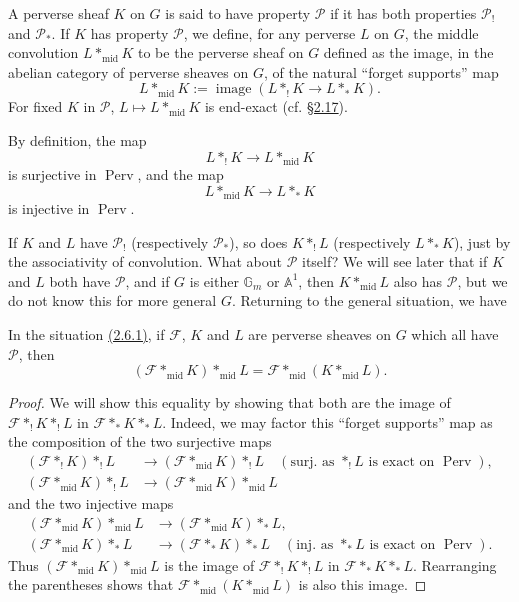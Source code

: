 A perverse sheaf \(K\) on \(G\) is said to have property \(\mathcal{P}\) if it
has both properties \(\mathcal{P}_!\) and \(\mathcal{P}_*\). If \(K\) has
property \(\mathcal{P}\), we define, for any perverse \(L\) on \(G\), the
middle convolution \(L*_{\mathrm{mid}}K\) to be the perverse sheaf on \(G\)
defined as the image, in the abelian category of perverse sheaves on \(G\), of
the natural ``forget supports'' map
\[
  L*_{\mathrm{mid}}K:=\operatorname{image}(L*_!K\to L*_*K).
\]
For fixed \(K\) in \(\mathcal{P}\), \(L\mapsto L*_{\mathrm{mid}}K\) is
end-exact (cf. \hyperref[sec:2.17]{\S2.17}).

By definition, the map
\[
  L*_!K\to L*_{\mathrm{mid}}K
\]
is surjective in \(\operatorname{Perv}\), and the map
\[
  L*_{\mathrm{mid}}K\to L*_*K
\]
is injective in \(\operatorname{Perv}\).

If \(K\) and \(L\) have \(\mathcal{P}_!\) (respectively \(\mathcal{P}_*\)), so
does \(K*_!L\) (respectively \(L*_*K\)), just by the associativity of
convolution. What about \(\mathcal{P}\) itself? We will see later that if
\(K\) and \(L\) both have \(\mathcal{P}\), and if \(G\) is either
\(\mathbb{G}_m\) or \(\mathbb{A}^1\), then \(K*_{\mathrm{mid}}L\) also has
\(\mathcal{P}\), but we do not know this for more general \(G\). Returning to
the general situation, we have

In the situation \hyperref[par:2.6.1]{(2.6.1)}, if \(\mathcal{F}\), \(K\) and \(L\) are perverse
sheaves on \(G\) which all have \(\mathcal{P}\), then
\[
  (\mathcal{F}*_{\mathrm{mid}}K)*_{\mathrm{mid}}L
  =
  \mathcal{F}*_{\mathrm{mid}}(K*_{\mathrm{mid}}L).
\]

\begin{proof}
We will show this equality by showing that both are the image of
\(\mathcal{F}*_!K*_!L\) in \(\mathcal{F}*_*K*_*L\). Indeed, we may factor
this ``forget supports'' map as the composition of the two surjective maps
\[
\begin{aligned}
  (\mathcal{F}*_!K)*_!L
  &\to(\mathcal{F}*_{\mathrm{mid}}K)*_!L
  \quad(\text{surj. as }*_!L\text{ is exact on }\operatorname{Perv}),\\
  (\mathcal{F}*_{\mathrm{mid}}K)*_!L
  &\to(\mathcal{F}*_{\mathrm{mid}}K)*_{\mathrm{mid}}L
\end{aligned}
\]
and the two injective maps
\[
\begin{aligned}
  (\mathcal{F}*_{\mathrm{mid}}K)*_{\mathrm{mid}}L
  &\to(\mathcal{F}*_{\mathrm{mid}}K)*_*L,\\
  (\mathcal{F}*_{\mathrm{mid}}K)*_*L
  &\to(\mathcal{F}*_*K)*_*L
  \quad(\text{inj. as }*_*L\text{ is exact on }\operatorname{Perv}).
\end{aligned}
\]
Thus \((\mathcal{F}*_{\mathrm{mid}}K)*_{\mathrm{mid}}L\) is the image of
\(\mathcal{F}*_!K*_!L\) in \(\mathcal{F}*_*K*_*L\). Rearranging the
parentheses shows that \(\mathcal{F}*_{\mathrm{mid}}(K*_{\mathrm{mid}}L)\) is
also this image.
\end{proof}

